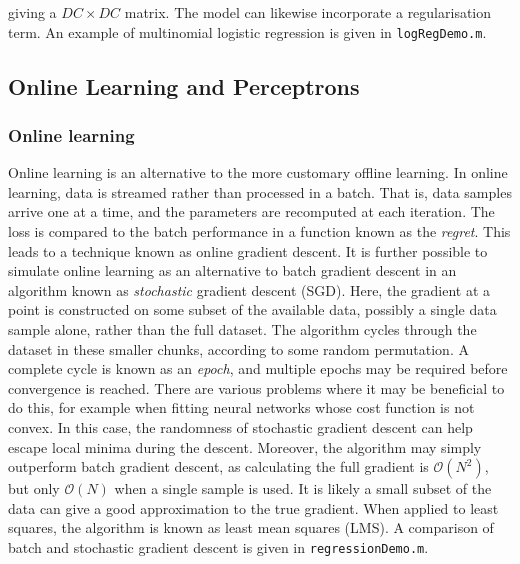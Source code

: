 \documentclass[11pt]{amsart}
\begin{document}
giving a $DC \times DC$ matrix. The model can likewise incorporate a regularisation term. An example of multinomial logistic regression is given in \texttt{logRegDemo.m}.

\subsection{Online Learning and Perceptrons}
\subsubsection{Online learning}
Online learning is an alternative to the more customary offline learning. In online learning, data is streamed rather than processed in a batch. That is, data samples arrive one at a time, and the parameters are recomputed at each iteration. The loss is compared to the batch performance in a function known as the \emph{regret}. This leads to a technique known as online gradient descent. It is further possible to simulate online learning as an alternative to batch gradient descent in an algorithm known as \emph{stochastic} gradient descent (SGD). Here, the gradient at a point is constructed on some subset of the available data, possibly a single data sample alone, rather than the full dataset. The algorithm cycles through the dataset in these smaller chunks, according to some random permutation. A complete cycle is known as an \emph{epoch}, and multiple epochs may be required before convergence is reached. There are various problems where it may be beneficial to do this, for example when fitting neural networks whose cost function is not convex. In this case, the randomness of stochastic gradient descent can help escape local minima during the descent. Moreover, the algorithm may simply outperform batch gradient descent, as calculating the full gradient is $\mathcal{O}(N^2)$, but only $\mathcal{O}(N)$ when a single sample is used. It is likely a small subset of the data can give a good approximation to the true gradient. When applied to least squares, the algorithm is known as least mean squares (LMS). A comparison of batch and stochastic gradient descent is given in \texttt{regressionDemo.m}.
\end{document}

